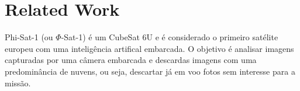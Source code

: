 %
%
%
%
%

%
%
%
%
%

\section{Related Work} \label{sec:related-work}

\cite{cosmas2020}

\cite{mateo-garcia2021}

Phi-Sat-1 (ou $\Phi$-Sat-1) \cite{phi-sat-1} é um CubeSat 6U e é considerado o primeiro satélite europeu com uma inteligência artifical embarcada. O objetivo é analisar imagens capturadas por uma câmera embarcada e descardas imagens com uma predominância de nuvens, ou seja, descartar já em voo fotos sem interesse para a missão.

